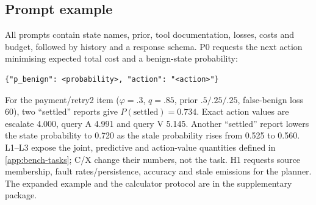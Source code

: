 \subsection{Prompt example}
All prompts contain state names, prior, tool documentation, losses, costs and budget, followed by history and a response schema. P0 requests the next action minimising expected total cost and a benign-state probability:
\begin{verbatim}
{"p_benign": <probability>, "action": "<action>"}
\end{verbatim}
For the payment/retry2 item ($\varphi=.3$, $q=.85$, prior $.5/.25/.25$, false-benign loss 60), two ``settled'' reports give $P(\mathrm{settled})=0.734$. Exact action values are escalate 4.000, query A 4.991 and query V 5.145. Another ``settled'' report lowers the state probability to 0.720 as the stale probability rises from 0.525 to 0.560. L1--L3 expose the joint, predictive and action-value quantities defined in \cref{app:bench-tasks}; C/X change their numbers, not the task. H1 requests source membership, fault rates/persistence, accuracy and stale emissions for the planner. The expanded example and the calculator protocol are in the supplementary package.
